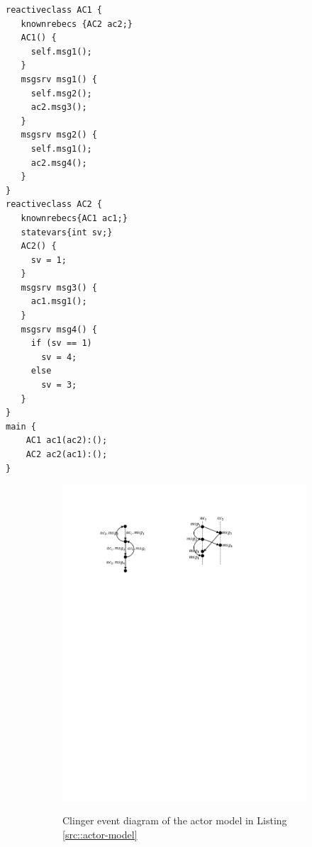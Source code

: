 \begin{lstlisting}[language=rebeca, caption= A simple actor model (from \cite{DBLP:journals/eceasst/KhamespanahSMSR15}), label=src::actor-model]
reactiveclass AC1 {
   knownrebecs {AC2 ac2;}
   AC1() {
     self.msg1();
   }
   msgsrv msg1() {
     self.msg2();
     ac2.msg3();
   }
   msgsrv msg2() {
     self.msg1();
     ac2.msg4();
   }
}
reactiveclass AC2 {
   knownrebecs{AC1 ac1;}
   statevars{int sv;}
   AC2() {
     sv = 1;
   }
   msgsrv msg3() {
     ac1.msg1();
   }
   msgsrv msg4() {
     if (sv == 1)
       sv = 4;
     else
       sv = 3;
   }
}
main {
    AC1 ac1(ac2):();
    AC2 ac2(ac1):();
}
\end{lstlisting}

\begin{figure}
\centering
\begin{subfigure}[b]{0.2\textwidth}
  \centering
  \small{
   \includegraphics[width=.8\textwidth]{resources/clinger.pdf}
  }
  \caption{Clinger event diagram of the actor model in Listing \ref{src::actor-model}}
  \label{fig::clinger}
\end{subfigure}
\qquad
\begin{subfigure}[b]{0.2\textwidth}


\end{subfigure}
\end{figure}
